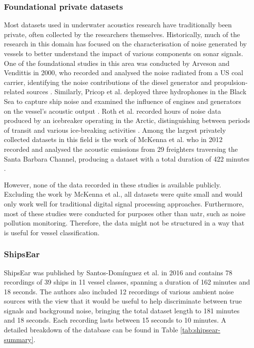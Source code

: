\subsubsection{Foundational private datasets}

Most datasets used in underwater acoustics research have traditionally been private, often collected by the researchers themselves. Historically, much of the research in this domain has focused on the characterisation of noise generated by vessels to better understand the impact of various components on sonar signals. One of the foundational studies in this area was conducted by Arveson and Vendittis in 2000, who recorded and analysed the noise radiated from a US coal carrier, identifying the noise contributions of the diesel generator and propulsion-related sources \cite{arveson_radiated_2000}. Similarly, Pricop et al. deployed three hydrophones in the Black Sea to capture ship noise and examined the influence of engines and generators on the vessel's acoustic output \cite{pricop_underwater_2010}. Roth et al. recorded hours of noise data produced by an icebreaker operating in the Arctic, distinguishing between periods of transit and various ice-breaking activities \cite{roth_underwater_2013}. Among the largest privately collected datasets in this field is the work of McKenna et al. who in 2012 recorded and analysed the acoustic emissions from 29 freighters traversing the Santa Barbara Channel, producing a dataset with a total duration of 422 minutes \cite{mckenna_underwater_2012}. 

However, none of the data recorded in these studies is available publicly. Excluding the work by McKenna et al., all datasets were quite small and would only work well for traditional digital signal processing approaches. Furthermore, most of these studies were conducted for purposes other than \acrshort{uatr}, such as noise pollution monitoring. Therefore, the data might not be structured in a way that is useful for vessel classification.

\subsubsection{ShipsEar}\label{subsubsec:shipsear}

ShipsEar \cite{david_santos-dominguez_shipsear_2016} was published by Santos-Dom\'inguez et al. in 2016 and contains 78 recordings of 39 ships in 11 vessel classes, spanning a duration of 162 minutes and 18 seconds. The authors also included 12 recordings of various ambient noise sources with the view that it would be useful to help discriminate between true signals and background noise, bringing the total dataset length to 181 minutes and 18 seconds. Each recording lasts between 15 seconds to 10 minutes. A detailed breakdown of the database can be found in Table \ref{tab:shipsear-summary}. 

